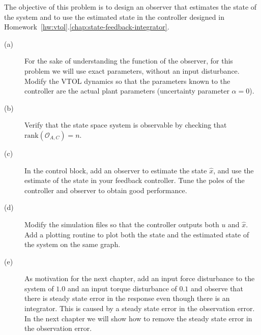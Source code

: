 The objective of this problem is to design an observer that estimates the state of the system and to use the estimated state in the controller designed in Homework~\ref{hw:vtol}.\ref{chap:state-feedback-integrator}.
\begin{description}
\item[(a)] For the sake of understanding the function of the observer, for this problem we will use exact parameters, without an input disturbance.  Modify the VTOL dynamics so that the parameters known to the controller are the actual plant parameters (uncertainty parameter $\alpha=0$).
\item[(b)] Verify that the state space system is observable by checking that $\text{rank}(\mathcal{O}_{A,C})=n$.
\item[(c)] In the control block, add an observer to estimate the state $\hat{x}$, and use the estimate of the state in your feedback controller. Tune the poles of the controller and observer to obtain good performance.  
\item[(d)] Modify the simulation files so that the controller outputs both $u$ and $\hat{x}$.  Add a plotting routine to plot both the state and the estimated state of the system on the same graph.
\item[(e)] As motivation for the next chapter, add an input force disturbance to the system of $1.0$ and an input torque disturbance of $0.1$ and observe that there is steady state error in the response even though there is an integrator.  This is caused by a steady state error in the observation error.  In the next chapter we will show how to remove the steady state error in the observation error.
\end{description}
